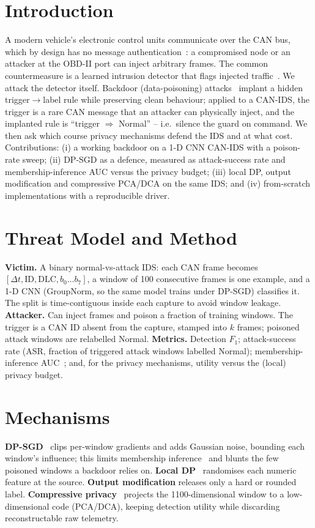 \documentclass[conference]{IEEEtran}
\begin{document}
\section{Introduction}
A modern vehicle's electronic control units communicate over the CAN bus, which by
design has no message authentication~\cite{koscher2010experimental}: a compromised
node or an attacker at the OBD-II port can inject arbitrary frames. The common
countermeasure is a learned intrusion detector that flags injected
traffic~\cite{song2020invehicle,lee2017otids}. We attack the detector itself.
Backdoor (data-poisoning) attacks~\cite{gu2017badnets} implant a hidden
trigger$\rightarrow$label rule while preserving clean behaviour; applied to a
CAN-IDS, the trigger is a rare CAN message that an attacker can physically inject,
and the implanted rule is ``trigger $\Rightarrow$ Normal'' -- i.e.\ silence the
guard on command. We then ask which course privacy mechanisms defend the IDS and
at what cost. Contributions: (i) a working backdoor on a 1-D CNN CAN-IDS with a
poison-rate sweep; (ii) DP-SGD as a defence, measured as attack-success rate and
membership-inference AUC versus the privacy budget; (iii) local DP, output
modification and compressive PCA/DCA on the same IDS; and (iv) from-scratch
implementations with a reproducible driver.

\section{Threat Model and Method}
\textbf{Victim.} A binary normal-vs-attack IDS: each CAN frame becomes
$[\Delta t,\text{ID},\text{DLC},b_0\ldots b_7]$, a window of 100 consecutive frames
is one example, and a 1-D CNN (GroupNorm, so the same model trains under DP-SGD)
classifies it. The split is time-contiguous inside each capture to avoid window
leakage. \textbf{Attacker.} Can inject frames and poison a fraction of training
windows. The trigger is a CAN ID absent from the capture, stamped into $k$ frames;
poisoned attack windows are relabelled Normal. \textbf{Metrics.} Detection
$F_1$; attack-success rate (ASR, fraction of triggered attack windows labelled
Normal); membership-inference AUC~\cite{yeom2018privacy}; and, for the privacy
mechanisms, utility versus the (local) privacy budget.

\section{Mechanisms}
\textbf{DP-SGD}~\cite{abadi2016deep} clips per-window gradients and adds Gaussian
noise, bounding each window's influence; this limits membership
inference~\cite{shokri2017membership} and blunts the few poisoned windows a
backdoor relies on. \textbf{Local DP}~\cite{duchi2013local,wang2019collecting}
randomises each numeric feature at the source. \textbf{Output modification}
releases only a hard or rounded label. \textbf{Compressive privacy}~\cite{kung2017compressive}
projects the 1100-dimensional window to a low-dimensional code (PCA/DCA), keeping
detection utility while discarding reconstructable raw telemetry.
\end{document}
